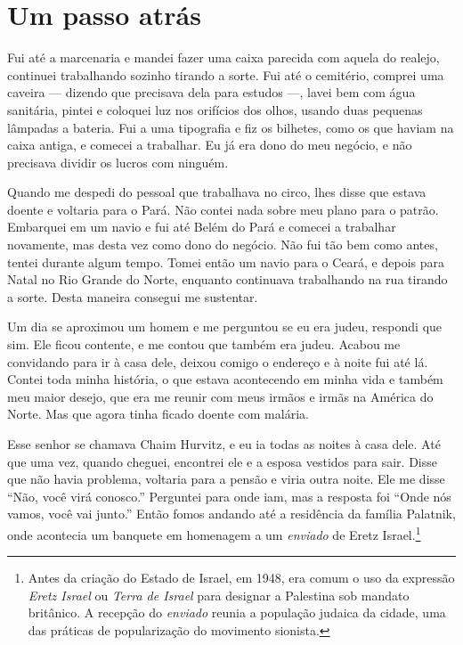 \chapter{Um passo atrás}

Fui até a marcenaria e mandei fazer uma caixa parecida com aquela do
realejo, continuei trabalhando sozinho tirando a sorte. Fui até o
cemitério, comprei uma caveira --- dizendo que precisava dela para estudos  ---,
lavei bem com água sanitária, pintei e coloquei luz nos orifícios dos
olhos, usando duas pequenas lâmpadas a bateria. Fui a uma tipografia e
fiz os bilhetes, como os que haviam na caixa antiga, e comecei a trabalhar. Eu
já era dono do meu negócio, e não precisava dividir os lucros com
ninguém.

Quando me despedi do pessoal que trabalhava no circo, lhes disse que
estava doente e voltaria para o Pará. Não contei nada sobre meu plano
para o patrão. Embarquei em um navio e fui até Belém do Pará e comecei a
trabalhar novamente, mas desta vez como dono do negócio. Não fui tão bem 
como antes, tentei durante algum tempo. Tomei então um navio para o 
Ceará, e depois para Natal no Rio Grande do Norte, enquanto continuava
trabalhando na rua tirando a sorte. Desta maneira consegui me
sustentar.

Um dia se aproximou um homem e me perguntou se eu era judeu, respondi
que sim. Ele ficou contente, e me contou que também era judeu. Acabou me
convidando para ir à casa dele, deixou comigo o endereço e à noite fui até lá.
Contei toda minha história, o que estava acontecendo em minha vida e
também meu maior desejo, que era me reunir com meus irmãos e irmãs na América
do Norte. Mas que agora tinha ficado doente com malária. 

Esse senhor se chamava Chaim Hurvitz, e eu ia todas as noites à casa dele. Até que uma vez, quando cheguei, encontrei ele e a esposa vestidos para sair. Disse que não havia problema, voltaria para a pensão e viria outra noite. Ele me disse ``Não, você virá conosco.'' Perguntei para onde iam, mas a resposta foi ``Onde nós vamos, você vai junto.'' Então fomos andando até a residência da família Palatnik, onde acontecia um banquete em homenagem a um \textit{enviado} de Eretz Israel.\footnote{Antes da criação do Estado de Israel, em 1948, era comum o uso da expressão \textit{Eretz Israel} ou \textit{Terra de Israel} para designar a Palestina sob mandato britânico. A recepção do \textit{enviado} reunia a população judaica da cidade, uma das práticas de popularização do movimento sionista.} 

